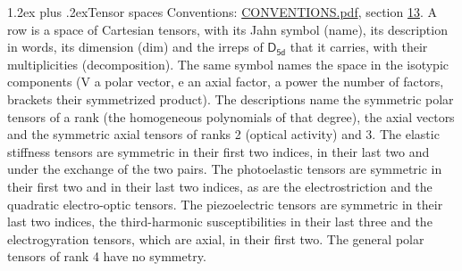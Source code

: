 \documentclass[10pt,a4paper]{article}
\makeatletter
\renewcommand\section{\@startsection{section}{1}{\z@}{-3ex plus -1ex minus -.2ex}%
  {1.2ex plus .2ex}{\normalfont\large\sffamily\bfseries\color{parttitle}}}
\numberwithin{equation}{section}
\newcommand{\grp}[1]{\mathsf{#1}}
\makeatother
\begin{document}
\section{Tensor spaces}\label{s:tensor_spaces}
Conventions: \href{../../CONVENTIONS.pdf}{CONVENTIONS.pdf}, section \href{../../CONVENTIONS.pdf\#conv.13}{13}.
\leavevmode\label{n:head.name}\label{n:head.description}\label{n:head.dim}\label{n:head.decomposition}A row is a space of Cartesian tensors, with its Jahn symbol (name), its description in words, its dimension (dim) and the irreps of $\grp{D_{5d}}$ that it carries, with their multiplicities (decomposition). \label{n:label.jahn}The same symbol names the space in the isotypic components (V a polar vector, e an axial factor, a power the number of factors, brackets their symmetrized product). The descriptions name the symmetric polar tensors of a rank (the homogeneous polynomials of that degree), the axial vectors and the symmetric axial tensors of ranks 2 (optical activity) and 3. The elastic stiffness tensors are symmetric in their first two indices, in their last two and under the exchange of the two pairs. The photoelastic tensors are symmetric in their first two and in their last two indices, as are the electrostriction and the quadratic electro-optic tensors. The piezoelectric tensors are symmetric in their last two indices, the third-harmonic susceptibilities in their last three and the electrogyration tensors, which are axial, in their first two. The general polar tensors of rank 4 have no symmetry.
\end{document}
